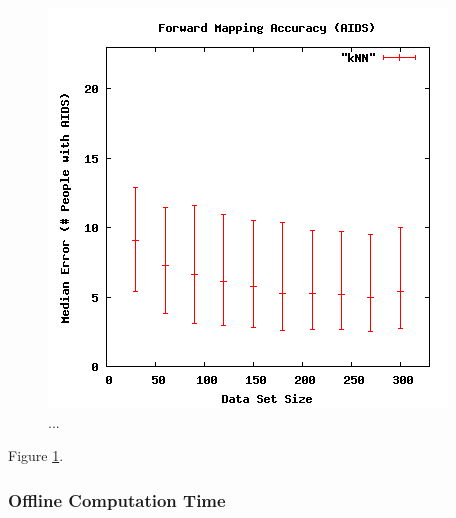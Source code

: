 \begin{figure}[ht]
\centering
\includegraphics[scale=.5]{images/results_aids/aids-fmacc.png}
\caption{...}
\label{fig:aidsfmacc}
\end{figure}

Figure \ref{fig:aidsfmacc}.


  \subsubsection{Offline Computation Time}


